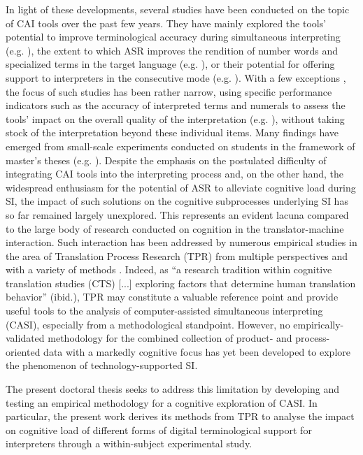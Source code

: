 In light of these developments, several studies have been conducted on the topic of CAI tools over the past few years. They have mainly explored the tools' potential to improve terminological accuracy during simultaneous interpreting (e.g. \citealt{prandi_uso_2015,prandi_use_2015}), the extent to which ASR improves the rendition of number words and specialized terms in the target language (e.g. \citealt{defrancq_automatic_2020}), or their potential for offering support to interpreters in the consecutive mode (e.g. \citealt{wang2019can}). With a few exceptions \citep{biagini_glossario_2015,frittella_cai-supported_2021}, the focus of such studies has been rather narrow, using specific performance indicators such as the accuracy of interpreted terms and numerals to assess the tools' impact on the overall quality of the interpretation (e.g. \citealt{pisani_measuring_2021}), without taking stock of the interpretation beyond these individual items. Many findings have emerged from small-scale experiments conducted on students in the framework of master's theses (e.g. \citealt{canali_utilizzo_2018,van_cauwenberghe_etude_2020}). Despite the emphasis on the postulated difficulty of integrating CAI tools into the interpreting process and, on the other hand, the widespread enthusiasm for the potential of ASR to alleviate cognitive load during SI, the impact of such solutions on the cognitive subprocesses underlying SI has so far remained largely unexplored. This represents an evident lacuna compared to the large body of research conducted on cognition in the translator-machine interaction. Such interaction has been addressed by numerous empirical studies in the area of Translation Process Research (TPR) from multiple perspectives and with a variety of methods \citep[xvii]{carl_measuring_2021}. Indeed, as ``a research tradition within cognitive translation studies (CTS) [...] exploring factors that determine human translation behavior'' (ibid.), TPR may constitute a valuable reference point and provide useful tools to the analysis of computer-assisted simultaneous interpreting (CASI), especially from a methodological standpoint. However, no empirically-validated methodology for the combined collection of product- and process-oriented data with a markedly cognitive focus has yet been developed to explore the phenomenon of technology-supported SI.

The present doctoral thesis seeks to address this limitation by developing and testing an empirical methodology for a cognitive exploration of CASI. In particular, the present work derives its methods from TPR to analyse the impact on cognitive load of different forms of digital terminological support for interpreters through a within-subject experimental study.

